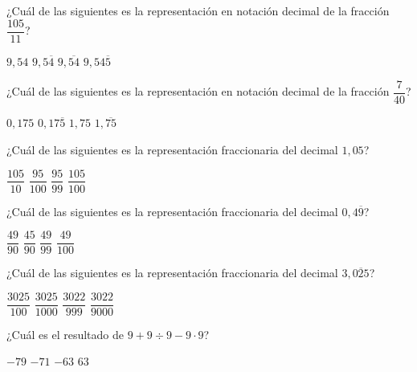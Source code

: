 \documentclass[spanish,letterpaper, 12pt, addpoints, answers]{exam}
\begin{document}
\begin{questions}
    \question[1] ¿Cuál de las siguientes es la representación en notación decimal de la fracción $\dfrac{105}{11}$?
    \begin{choices}
        \choice $9,54$
        \choice $9,5\overline{4}$
        \CorrectChoice $9,\overline{54}$
        \choice $9,54\overline{5}$
    \end{choices}
    \vspace{0.15in}

    \question[1] ¿Cuál de las siguientes es la representación en notación decimal de la fracción $\dfrac{7}{40}$?
    \begin{choices}
        \CorrectChoice $0,175$
        \choice $0,17\overline{5}$
        \choice $1,75$
        \choice $1,\overline{75}$
    \end{choices}
    \vspace{0.15in}

\newpage
    \question[1] ¿Cuál de las siguientes es la representación fraccionaria del decimal $1,05$?
    \begin{choices}
        \choice $\dfrac{105}{10}$
        \choice $\dfrac{95}{100}$
        \choice $\dfrac{95}{99}$
        \CorrectChoice $\dfrac{105}{100}$
    \end{choices}
    \vspace{0.15in}

    \question[1] ¿Cuál de las siguientes es la representación fraccionaria del decimal $0,4\overline{9}$?
    \begin{choices}
        \choice $\dfrac{49}{90}$
        \CorrectChoice $\dfrac{45}{90}$
        \choice $\dfrac{49}{99}$
        \choice $\dfrac{49}{100}$
    \end{choices}
    \vspace{0.15in}

    \question[1] ¿Cuál de las siguientes es la representación fraccionaria del decimal $3,\overline{025}$?
    \begin{choices}
        \choice $\dfrac{3025}{100}$
        \choice $\dfrac{3025}{1000}$
        \CorrectChoice $\dfrac{3022}{999}$
        \choice $\dfrac{3022}{9000}$
    \end{choices}
    \vspace{0.15in}

    \question[1] ¿Cuál es el resultado de $9+9\div 9-9\cdot 9$?
    \begin{choices}
        \choice $-79$
        \CorrectChoice $-71$
        \choice $-63$
        \choice $63$
    \end{choices}
    \vspace{0.15in}


\end{questions}
\end{document}
